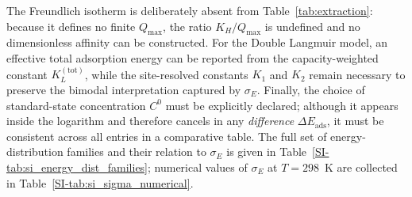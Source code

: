 \documentclass[journal=jacsat,manuscript=article]{achemso}
\begin{document}
	The Freundlich isotherm is deliberately absent from Table~\ref{tab:extraction}: because it defines no finite $Q_{\max}$, the ratio $K_H/Q_{\max}$ is undefined and no dimensionless affinity can be constructed. For the Double Langmuir model, an effective total adsorption energy can be reported from the capacity-weighted constant $K_L^{\mathrm{(tot)}}$, while the site-resolved constants $K_1$ and $K_2$ remain necessary to preserve the bimodal interpretation captured by $\sigma_E$. Finally, the choice of standard-state concentration $C^{0}$ must be explicitly declared; although it appears inside the logarithm and therefore cancels in any \emph{difference} $\Delta E_{\mathrm{ads}}$, it must be consistent across all entries in a comparative table. The full set of energy-distribution families and their relation to $\sigma_E$ is given in Table~\ref{SI-tab:si_energy_dist_families}; numerical values of $\sigma_E$ at $T = 298$~K are collected in Table~\ref{SI-tab:si_sigma_numerical}.
\end{document}
